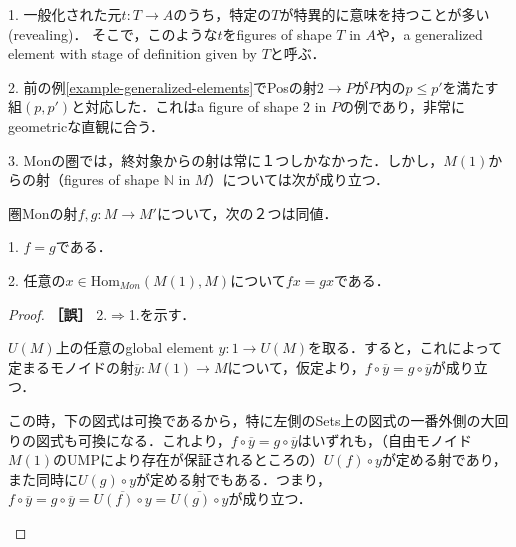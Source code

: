 \documentclass[uplatex, dvipdfmx]{jsarticle}
\begin{document}
\begin{example}
    1. 一般化された元$t:T\to A$のうち，特定の$T$が特異的に意味を持つことが多い(revealing)．
    そこで，このような$t$をfigures of shape $T$ in $A$や，a generalized element with stage of definition given by $T$と呼ぶ．
    
    2. 前の例\ref{example-generalized-elements}でPosの射$2\to P$が$P$内の$p\le p'$を満たす組$(p,p')$と対応した．これはa figure of shape $2$ in $P$の例であり，非常にgeometricな直観に合う．

    3. Monの圏では，終対象からの射は常に１つしかなかった．しかし，$M(1)$からの射（figures of shape $\mathbb{N}$ in $M$）については次が成り立つ．
    \begin{proposition*}[$M(1)$-値点がモノイドの射を決定する]
        圏Monの射$f,g:M\to M'$について，次の２つは同値．

        1. $f=g$である．

        2. 任意の$x\in \mathrm{Hom}_{Mon}(M(1),M)$について$fx=gx$である．
    \end{proposition*}
    \begin{proof}\textbf{［誤］}
        2.$\Rightarrow$1.を示す．
        
        $U(M)$上の任意のglobal element $y:1\to U(M)$を取る．すると，これによって定まるモノイドの射$\overline{y}:M(1)\to M$について，仮定より，$f\circ \overline{y}=g\circ\overline{y}$が成り立つ．
        
        この時，下の図式は可換であるから，特に左側のSets上の図式の一番外側の大回りの図式も可換になる．これより，$f\circ \overline{y}=g\circ\overline{y}$はいずれも，（自由モノイド$M(1)$のUMPにより存在が保証されるところの）$U(f)\circ y$が定める射であり，また同時に$U(g)\circ y$が定める射でもある．つまり，$f\circ \overline{y}=g\circ\overline{y}=\overline{U(f)\circ y}=\overline{U(g)\circ y}$が成り立つ．
        \begin{center}
        \end{center}


\end{proof}
\end{example}
\end{document}

